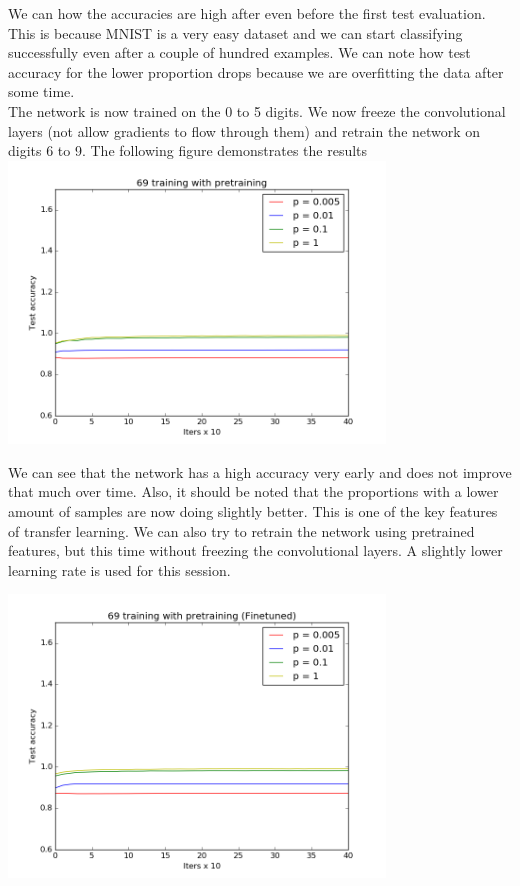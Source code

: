 \documentclass[11pt]{article}
\begin{document}
We can how the accuracies are high after even before the first test evaluation. This is because MNIST is a very easy dataset and we can start classifying successfully even after a couple of hundred examples. We can note how test accuracy for the lower proportion drops because we are overfitting the data after some time.\\

The network is now trained on the 0 to 5 digits. We now freeze the convolutional layers (not allow gradients to flow through them) and retrain the network on digits 6 to 9. The following figure demonstrates the results \\ 

\includegraphics[width=10cm]{69trainingwithpretraining}

We can see that the network has a high accuracy very early and does not improve that much over time.
Also, it should be noted that the proportions with a lower amount of samples are now doing slightly better. This is one of the key features of transfer learning. We can also try to retrain the network using pretrained features, but this time without freezing the convolutional layers. A slightly lower learning rate is used for this session.

\includegraphics[width=10cm]{69trainingwithpretraining(Finetuned)}
\end{document}
